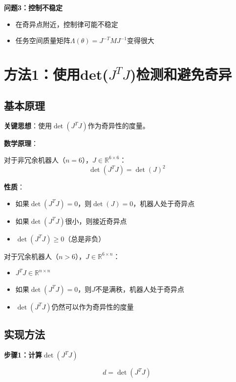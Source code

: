 \documentclass[12pt,a4paper]{article}
\begin{document}
\textbf{问题3：控制不稳定}
\begin{itemize}
\item 在奇异点附近，控制律可能不稳定
\item 任务空间质量矩阵$\Lambda(\theta) = J^{-T}MJ^{-1}$变得很大
\end{itemize}

\section{方法1：使用det($J^T J$)检测和避免奇异}

\subsection{基本原理}

\textbf{关键思想}：使用$\det(J^T J)$作为奇异性的度量。

\textbf{数学原理}：

对于非冗余机器人（$n = 6$），$J \in \mathbb{R}^{6 \times 6}$：
\begin{equation}
\det(J^T J) = \det(J)^2
\end{equation}

\textbf{性质}：
\begin{itemize}
\item 如果$\det(J^T J) = 0$，则$\det(J) = 0$，机器人处于奇异点
\item 如果$\det(J^T J)$很小，则接近奇异点
\item $\det(J^T J) \geq 0$（总是非负）
\end{itemize}

对于冗余机器人（$n > 6$），$J \in \mathbb{R}^{6 \times n}$：
\begin{itemize}
\item $J^T J \in \mathbb{R}^{n \times n}$
\item 如果$\det(J^T J) = 0$，则$J$不是满秩，机器人处于奇异点
\item $\det(J^T J)$仍然可以作为奇异性的度量
\end{itemize}

\subsection{实现方法}

\textbf{步骤1：计算$\det(J^T J)$}

\begin{equation}
d = \det(J^T J)
\end{equation}
\end{document}
